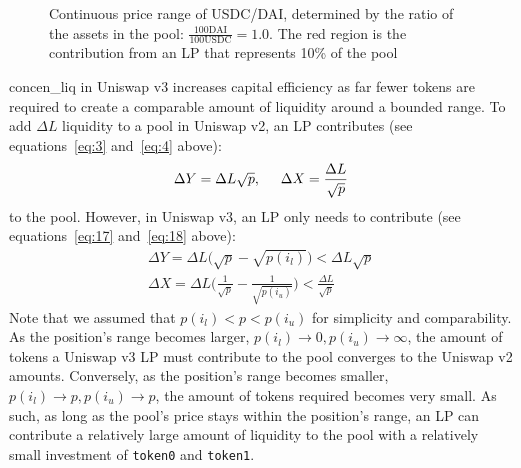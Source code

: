 \documentclass[11pt]{article}
\begin{document}
\vspace{0.5cm} %
\begin{figure}[H]
    \centering
    \vspace{0.5cm}
    \caption{Continuous price range of USDC/DAI, determined by the ratio of the assets in the pool: $\frac{100 \text{DAI}}{100 \text{USDC}} = 1.0$. The red region is the contribution from an LP that represents 10\% of the pool}
    \label{fig:capital_inefficiency_price_diagram}
\end{figure}

\Gls{concen_liq} in Uniswap v3 increases capital efficiency as far fewer tokens are required to create a comparable amount of liquidity around a bounded range. To add $\Delta L$ liquidity to a pool in Uniswap v2, an LP contributes (see equations~\eqref{eq:3} and~\eqref{eq:4} above):
\begin{gather*}
    \Delta Y = \Delta L \sqrt{p}, \hspace{0.5cm} \Delta X = \frac{\Delta L}{\sqrt{p}}
\end{gather*}
to the pool. However, in Uniswap v3, an LP only needs to contribute (see equations~\eqref{eq:17} and~\eqref{eq:18} above):
\begin{gather*}
    \Delta Y = \Delta L \big( \sqrt{p} - \sqrt{p(i_l)} \big) < \Delta L \sqrt{p} \\
    \Delta X = \Delta L \bigg( \frac{1}{\sqrt{p}} - \frac{1}{\sqrt{p(i_u)}} \bigg) < \frac{\Delta L}{\sqrt{p}}
\end{gather*}
Note that we assumed that $p(i_l) < p < p(i_u)$ for simplicity and comparability. As the position's range becomes larger, $p(i_l) \rightarrow 0, p(i_u) \rightarrow \infty$, the amount of tokens a Uniswap v3 LP must contribute to the pool converges to the Uniswap v2 amounts. Conversely, as the position's range becomes smaller, $p(i_l) \rightarrow p, p(i_u) \rightarrow p$, the amount of tokens required becomes very small. As such, as long as the pool's price stays within the position's range, an LP can contribute a relatively large amount of liquidity to the pool with a relatively small investment of \texttt{token0} and \texttt{token1}.
\end{document}
